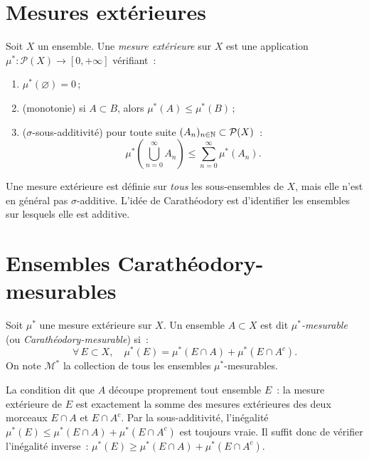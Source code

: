 \section{Mesures ext\'erieures}

\begin{definition}
Soit $X$ un ensemble. Une \emph{mesure ext\'erieure} sur $X$ est une application
$\mu^* : \mathcal{P}(X) \to [0, +\infty]$ v\'erifiant~:
\begin{enumerate}
    \item[(i)] $\mu^*(\varnothing) = 0$\,;
    \item[(ii)] (monotonie) si $A \subset B$, alors $\mu^*(A) \leq \mu^*(B)$\,;
    \item[(iii)] ($\sigma$-sous-additivit\'e) pour toute suite $(A_n)_{n \in \mathbb{N}}
    \subset \mathcal{P}(X)$~:
    \[
    \mu^*\!\left(\bigcup_{n=0}^{\infty} A_n\right) \leq \sum_{n=0}^{\infty}
    \mu^*(A_n).
    \]
\end{enumerate}
\end{definition}

\begin{remarque}
Une mesure ext\'erieure est d\'efinie sur \emph{tous} les sous-ensembles de $X$, mais
elle n'est en g\'en\'eral pas $\sigma$-additive. L'id\'ee de Carath\'eodory est
d'identifier les ensembles sur lesquels elle est additive.
\end{remarque}

\section{Ensembles Carath\'eodory-mesurables}

\begin{definition}
\label{def:caratheodory_mesurable}
Soit $\mu^*$ une mesure ext\'erieure sur $X$. Un ensemble $A \subset X$ est dit
\emph{$\mu^*$-mesurable} (ou \emph{Carath\'eodory-mesurable}) si~:
\[
\forall\, E \subset X, \quad \mu^*(E) = \mu^*(E \cap A) + \mu^*(E \cap A^c).
\]
On note $\mathcal{M}^*$ la collection de tous les ensembles $\mu^*$-mesurables.
\end{definition}

\begin{intuition}[title=\textbf{Interpr\'etation du crit\`ere de Carath\'eodory}]
La condition dit que $A$ \og d\'ecoupe \fg proprement tout ensemble $E$~: la mesure
ext\'erieure de $E$ est exactement la somme des mesures ext\'erieures des deux
morceaux $E \cap A$ et $E \cap A^c$. Par la sous-additivit\'e, l'in\'egalit\'e
$\mu^*(E) \leq \mu^*(E \cap A) + \mu^*(E \cap A^c)$ est toujours vraie. Il suffit
donc de v\'erifier l'in\'egalit\'e inverse~:
$\mu^*(E) \geq \mu^*(E \cap A) + \mu^*(E \cap A^c)$.
\end{intuition}

